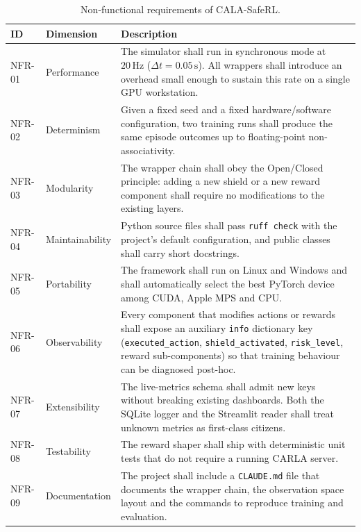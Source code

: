 \begin{table}[H]
  \centering
  \caption{Non-functional requirements of CALA-SafeRL.}
  \label{tab:nonfunctional-requirements}
  \small
  \begin{tabular}{@{}llp{7.8cm}@{}}
    \toprule
    \textbf{ID} & \textbf{Dimension} & \textbf{Description} \\
    \midrule
    NFR-01 & Performance             & The simulator shall run in synchronous mode at
        \(20\,\mathrm{Hz}\) (\(\Delta t = 0.05\,\mathrm{s}\)). All wrappers shall introduce an
        overhead small enough to sustain this rate on a single GPU workstation. \\
    NFR-02 & Determinism             & Given a fixed seed and a fixed hardware/software
        configuration, two training runs shall produce the same episode outcomes up to
        floating-point non-associativity. \\
    NFR-03 & Modularity              & The wrapper chain shall obey the Open/Closed principle:
        adding a new shield or a new reward component shall require no modifications to the
        existing layers. \\
    NFR-04 & Maintainability         & Python source files shall pass \texttt{ruff check} with
        the project's default configuration, and public classes shall carry short docstrings. \\
    NFR-05 & Portability             & The framework shall run on Linux and Windows and shall
        automatically select the best PyTorch device among CUDA, Apple MPS and CPU. \\
    NFR-06 & Observability           & Every component that modifies actions or rewards shall
        expose an auxiliary \texttt{info} dictionary key (\texttt{executed\_action},
        \texttt{shield\_activated}, \texttt{risk\_level}, reward sub-components) so that
        training behaviour can be diagnosed post-hoc. \\
    NFR-07 & Extensibility           & The live-metrics schema shall admit new keys without
        breaking existing dashboards. Both the SQLite logger and the Streamlit reader shall
        treat unknown metrics as first-class citizens. \\
    NFR-08 & Testability             & The reward shaper shall ship with deterministic unit
        tests that do not require a running CARLA server. \\
    NFR-09 & Documentation           & The project shall include a \texttt{CLAUDE.md} file that
        documents the wrapper chain, the observation space layout and the commands to reproduce
        training and evaluation. \\
    \bottomrule
  \end{tabular}
\end{table}

